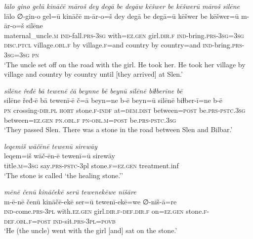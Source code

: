 \ea \label{ŽP.166}
\textit{lālo gino gelū kināčē māroš dey degā be degāw kēšwer be kēšwerū māroš silēne} \\ 
\gll lālo ∅-gin-o gel=ū kināčē m-ār-o=š dey degā be degā=ū kēšwer be kēšwer=ū m-ār-o=š silēne \\ 
 maternal\_uncle\textsc{.m} \textsc{ind-}fall\textsc{.prs}\textsc{-3sg} with\textsc{\textsc{=ez.gen}} girl\textsc{.dir}\textsc{.f} \textsc{ind-}bring\textsc{.prs}\textsc{-3sg}\textsc{=3sg} \textsc{disc.ptcl} village\textsc{.obl}\textsc{.f} by village\textsc{.f}=and country by country=and \textsc{ind-}bring\textsc{.prs}\textsc{-3sg}\textsc{=3sg} \textsc{pn} \\ 
\glt `The uncle set off on the road with the girl. He took her. He took her village by village and country by country until [they arrived] at Slen.'
\z 
 
\ea \label{ŽP.167}
\textit{silēne řeđē bā tewenē čā beynne bē beynū silēnē biɫberīne bē} \\ 
\gll silēne řeđ-ē bā tewenī-ē č=ā beyn=ne b-ē beyn=ū silēnē biɫber-ī=ne b-ē \\ 
 \textsc{pn} crossing\textsc{-dir}\textsc{.pl} \textsc{hort} stone\textsc{.f}\textsc{-indf} at=\textsc{dem.dist} between\textsc{=\textsc{post}} be\textsc{.prs}\textsc{-pstc}\textsc{.3sg} between\textsc{\textsc{=ez.gen}} \textsc{pn}\textsc{.obl}\textsc{.f} \textsc{pn}\textsc{-obl}\textsc{.m}\textsc{=\textsc{post}} be\textsc{.prs}\textsc{-pstc}\textsc{.3sg} \\ 
\glt `They passed Slen. There was a stone in the road between Slen and Bilbar.'
\z 
 
\ea \label{ŽP.168}
\textit{leqemiš wāčēnē tewenū sirewāy} \\ 
\gll leqem=iš wāč-ēn-ē tewenī=ū sirewāy \\ 
 title\textsc{.m}\textsc{=3sg} say\textsc{.prs-pstc}-3pl stone\textsc{.f}\textsc{\textsc{=ez.gen}} treatment.inf \\ 
\glt `The stone is called ‘the healing stone.’'
\z 
 
\ea \label{ŽP.169}
\textit{mēnē čenū kināčekē serū tewenekēwe nīšāre} \\ 
\gll m-ē-nē čenū kināčē-ekē ser=ū tewenī-ekē=we ∅-nīš-ā=re \\ 
 \textsc{ind-}come\textsc{.prs}\textsc{-3pl} with\textsc{.ez.gen} girl\textsc{.dir}\textsc{.f}\textsc{-def}\textsc{.dir}\textsc{.f} on\textsc{\textsc{=ez.gen}} stone\textsc{.f}\textsc{-def}\textsc{.obl}\textsc{.f}\textsc{=\textsc{post}} \textsc{ind-}sit\textsc{.prs}\textsc{-3pl}\textsc{=\textsc{povb}} \\ 
\glt `He (the uncle) went with the girl [and] sat on the stone.'
\z 
 
